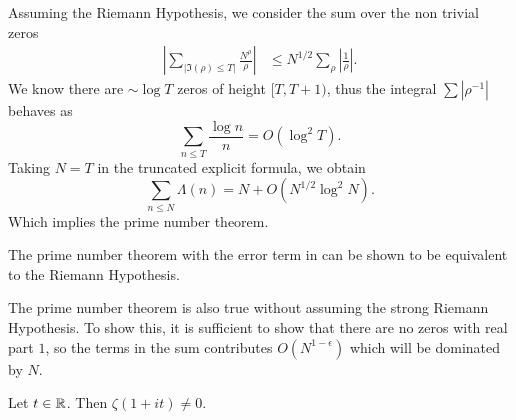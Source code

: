 Assuming the Riemann Hypothesis, we consider the sum over the non trivial zeros \begin{align*}
\left|\sum_{|\Im(\rho)\leq T|}\frac{N^\rho}{\rho}\right| &\leq N^{1/2} \sum_{\rho}\left|{\frac{1}{\rho}}\right|.    
\end{align*}
We know there are $\sim \log T$ zeros of height $[T,T+1)$, thus the integral $\sum |\rho^{-1}|$ behaves as \[
\sum_{n\leq T} \frac{\log n}{n} = O(\log^2 T).
\]
Taking $N=T$ in the truncated explicit formula, we obtain \begin{equation} \label{RHPNT}
    \sum_{n\leq N} \Lambda(n) = N + O(N^{1/2}\log^2 N).
\end{equation}
Which implies the prime number theorem.
\begin{remark}
    The prime number theorem with the error term in \label{RHPNT} can be shown to be equivalent to the Riemann Hypothesis.
\end{remark}
The prime number theorem is also true without assuming the strong Riemann Hypothesis. 
To show this, it is sufficient to show that there are no zeros with real part $1$, so the terms in the sum contributes $O(N^{1-\epsilon})$
which will be dominated by $N$.
\begin{theorem}\label{nozerosatone}
    Let $t\in\mathbb{R}$. Then $\zeta(1+it)\neq 0$.
\end{theorem}
